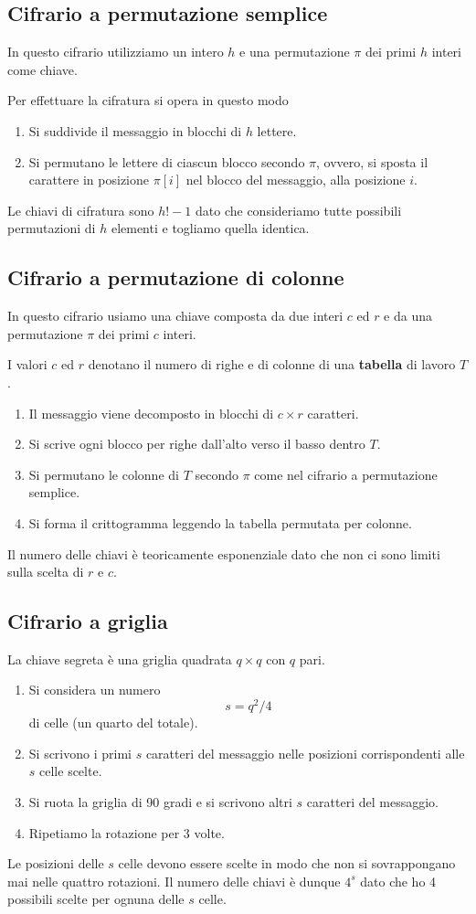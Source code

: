 \subsection{Cifrario a permutazione semplice}
In questo cifrario utilizziamo un intero $h$ e una permutazione $\pi$ dei primi $h$ interi come chiave.

Per effettuare la cifratura si opera in questo modo
\begin{enumerate}
	\item Si suddivide il messaggio in blocchi di $h$ lettere.
	\item Si permutano le lettere di ciascun blocco secondo $\pi$, ovvero, si sposta il carattere in posizione $\pi[i]$
	      nel blocco del messaggio, alla posizione $i$.
\end{enumerate}
Le chiavi di cifratura sono $h! - 1$ dato che consideriamo tutte possibili permutazioni di $h$ elementi e togliamo
quella identica.

\subsection{Cifrario a permutazione di colonne}
In questo cifrario usiamo una chiave composta da due interi $c$ ed $r$ e da una permutazione $\pi$ dei primi $c$ interi.

I valori $c$ ed $r$ denotano il numero di righe e di colonne di una \textbf{tabella} di lavoro $T$.
\begin{enumerate}
	\item Il messaggio viene decomposto in blocchi di $c \times r$ caratteri.
	\item Si scrive ogni blocco per righe dall'alto verso il basso dentro $T$.
	\item Si permutano le colonne di $T$ secondo $\pi$ come nel cifrario a permutazione semplice.
	\item Si forma il crittogramma leggendo la tabella permutata per colonne.
\end{enumerate}
Il numero delle chiavi \`e teoricamente esponenziale dato che non ci sono limiti sulla scelta di $r$ e $c$.

\subsection{Cifrario a griglia}
La chiave segreta \`e una griglia quadrata $q \times q$ con $q$ pari.
\begin{enumerate}
	\item Si considera un numero
	      \[ s = q^2 / 4 \]
	      di celle (un quarto del totale).
	\item Si scrivono i primi $s$ caratteri del messaggio nelle posizioni corrispondenti alle $s$ celle scelte.
	\item Si ruota la griglia di 90 gradi e si scrivono altri $s$ caratteri del messaggio.
	\item Ripetiamo la rotazione per 3 volte.
\end{enumerate}
Le posizioni delle $s$ celle devono essere scelte in modo che non si sovrappongano mai nelle quattro rotazioni. Il numero
delle chiavi \`e dunque $4^s$ dato che ho 4 possibili scelte per ognuna delle $s$ celle.

